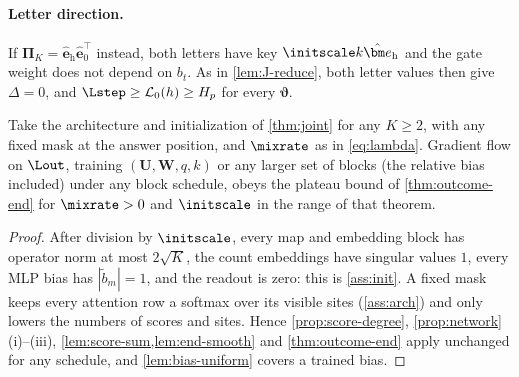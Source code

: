\paragraph{Letter direction.} If $\bm\Pi_K=\hat{\bm e}_{\mathrm h}\hat{\bm e}_0^\top$ instead, both letters have key $\initscale k\hat{\bm e}_{\mathrm h}$ and the gate weight does not depend on $b_t$.
As in \cref{lem:J-reduce}, both letter values then give $\Delta=0$, and $\Lstep\ge \mathcal L_0(h)\ge H_p$ for every $\bm\vartheta$.

\begin{corollary}
\label{cor:joint-outcome}
Take the architecture and initialization of \cref{thm:joint} for any $K\ge2$, with any fixed mask at the answer position, and $\mixrate$ as in
\cref{eq:lambda}. Gradient flow on $\Lout$, training $(\mathbf U,\mathbf W,q,k)$ or any larger set of blocks (the relative bias included) under any block
schedule, obeys the plateau bound of \cref{thm:outcome-end} for $\mixrate>0$ and $\initscale$ in the range of that theorem.
\end{corollary}

\begin{proof}
After division by $\initscale$, every map and embedding block has operator norm at most $2\sqrt K$, the count embeddings have singular values
$1$, every MLP bias has $|\tilde b_m|=1$, and the readout is zero: this is \cref{ass:init}. A fixed mask keeps every attention row a softmax over
its visible sites (\cref{ass:arch}) and only lowers the numbers of scores and sites. Hence \cref{prop:score-degree}, \cref{prop:network}(i)--(iii),
\cref{lem:score-sum,lem:end-smooth} and \cref{thm:outcome-end} apply unchanged for any schedule, and \cref{lem:bias-uniform} covers a trained bias.
\end{proof}

